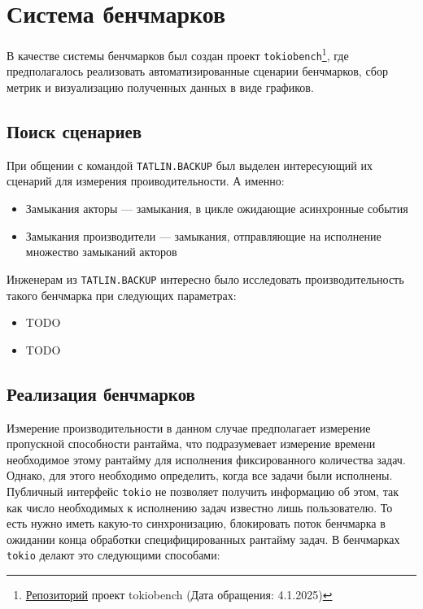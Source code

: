 
\section{Система бенчмарков}

В качестве системы бенчмарков был создан проект \verb|tokiobench|\footnote{\href{https://github.com/IgorErin/tokiobench}{Репозиторий} проект tokiobench (Дата обращения: 4.1.2025)}, где предполагалось реализовать автоматизированные сценарии бенчмарков, сбор метрик и визуализацию полученных данных в виде графиков.

\subsection{Поиск сценариев}

При общении с командой \verb|TATLIN.BACKUP| был выделен интересующий их сценарий для измерения проиводительности. А именно:

\begin{itemize}
    \item Замыкания акторы --- замыкания, в цикле ожидающие асинхронные события
    \item Замыкания производители --- замыкания, отправляющие на исполнение множество замыканий акторов
\end{itemize}

Инженерам из \verb|TATLIN.BACKUP| интересно было исследовать производительность такого бенчмарка при следующих параметрах:

\begin{itemize}
    \item TODO
    \item TODO
\end{itemize}

\subsection{Реализация бенчмарков}

Измерение производительности в данном случае предполагает измерение пропускной способности рантайма, что подразумевает измерение времени необходимое этому рантайму для исполнения фиксированного количества задач. Однако, для этого необходимо определить, когда все задачи были исполнены. Публичный интерфейс \verb|tokio| не позволяет получить информацию об этом, так как число необходимых к исполнению задач известно лишь пользователю. То есть нужно иметь какую-то синхронизацию, блокировать поток бенчмарка в ожидании конца обработки специфицированных рантайму задач. В бенчмарках \verb|tokio| делают это следующими способами:

